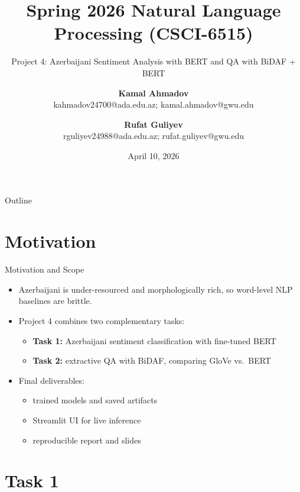 \documentclass{beamer}
\title{Spring 2026 Natural Language Processing (CSCI-6515)}
\subtitle{Project 4: Azerbaijani Sentiment Analysis with BERT and QA with BiDAF + BERT}
\author{
\textbf{Kamal Ahmadov} \\ \small kahmadov24700@ada.edu.az; kamal.ahmadov@gwu.edu \\ \and
\textbf{Rufat Guliyev} \\ \small rguliyev24988@ada.edu.az; rufat.guliyev@gwu.edu
}
\institute{ADA University \& George Washington University}
\date{April 10, 2026}
\begin{document}
\begin{frame}
  \titlepage
\end{frame}

\begin{frame}{Outline}
\tableofcontents
\end{frame}

\section{Motivation}

\begin{frame}{Motivation and Scope}
\begin{itemize}
  \item Azerbaijani is under-resourced and morphologically rich, so word-level NLP baselines are brittle.
  \item Project 4 combines two complementary tasks:
  \begin{itemize}
    \item \textbf{Task 1:} Azerbaijani sentiment classification with fine-tuned BERT
    \item \textbf{Task 2:} extractive QA with BiDAF, comparing GloVe vs.\ BERT
  \end{itemize}
  \item Final deliverables:
  \begin{itemize}
    \item trained models and saved artifacts
    \item Streamlit UI for live inference
    \item reproducible report and slides
  \end{itemize}
\end{itemize}
\end{frame}

\section{Task 1}
\end{document}
